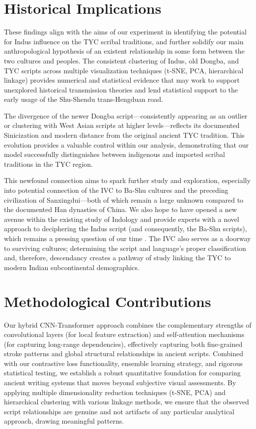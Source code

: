 \documentclass[11pt,a4paper,oneside]{report}
\begin{document}
\section{Historical Implications}
\noindent\hspace{1cm}
These findings align with the aims of our experiment in identifying the potential for Indus influence on the TYC scribal traditions, and further solidify our main anthropological hypothesis of an existent relationship in some form between the two cultures and peoples. The consistent clustering of Indus, old Dongba, and TYC scripts across multiple visualization techniques (t-SNE, PCA, hierarchical linkage) provides numerical and statistical evidence that may work to support unexplored historical transmission theories and lend statistical support to the early usage of the Shu-Shendu trans-Hengduan road.

The divergence of the newer Dongba script—consistently appearing as an outlier or clustering with West Asian scripts at higher levels—reflects its documented Sinicization and modern distance from the original ancient TYC tradition. This evolution provides a valuable control within our analysis, demonstrating that our model successfully distinguishes between indigenous and imported scribal traditions in the TYC region.

This newfound connection aims to spark further study and exploration, especially into potential connection of the IVC to Ba-Shu cultures and the preceding civilization of Sanxingdui—both of which remain a large unknown compared to the documented Han dynasties of China. We also hope to have opened a new avenue within the existing study of Indology and provide experts with a novel approach to deciphering the Indus script (and consequently, the Ba-Shu scripts), which remains a pressing question of our time \cite{kb_want_2025}. The IVC also serves as a doorway to surviving cultures; determining the script and language's proper classification and, therefore, descendancy creates a pathway of study linking the TYC to modern Indian subcontinental demographics.


\section{Methodological Contributions}
\noindent\hspace{1cm}
Our hybrid CNN-Transformer approach combines the complementary strengths of convolutional layers (for local feature extraction) and self-attention mechanisms (for capturing long-range dependencies), effectively capturing both fine-grained stroke patterns and global structural relationships in ancient scripts. Combined with our contrastive loss functionality, ensemble learning strategy, and rigorous statistical testing, we establish a robust quantitative foundation for comparing ancient writing systems that moves beyond subjective visual assessments. By applying multiple dimensionality reduction techniques (t-SNE, PCA) and hierarchical clustering with various linkage methods, we ensure that the observed script relationships are genuine and not artifacts of any particular analytical approach, drawing meaningful patterns.
\end{document}
